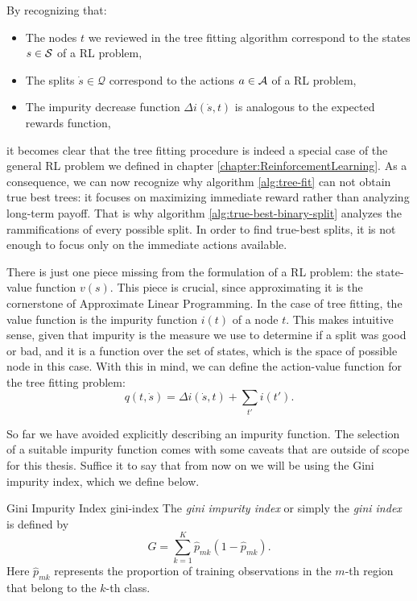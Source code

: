 By recognizing that:
\begin{itemize}
    \item The nodes $t$ we reviewed in the tree fitting algorithm correspond to
        the states $s \in \mathcal{S}$ of a RL problem,
    \item The splits $\dot{s} \in \mathcal{Q}$ correspond to the actions $a \in
        \mathcal{A}$ of a RL problem,
    \item The impurity decrease function $\Delta i(\dot{s}, t)$ is analogous to
        the expected rewards function,
\end{itemize}
it becomes clear that the tree fitting procedure is indeed a special case of the
general RL problem we defined in chapter \ref{chapter:ReinforcementLearning}. As
a consequence, we can now recognize why algorithm \ref{alg:tree-fit} can not
obtain true best trees: it focuses on maximizing immediate reward rather than
analyzing long-term payoff. That is why algorithm
\ref{alg:true-best-binary-split} analyzes the rammifications of every possible
split. In order to find true-best splits, it is not enough to focus only on the
immediate actions available.

There is just one piece missing from the formulation of a RL problem: the state-value function $v(s)$. This piece is crucial, since approximating it is the cornerstone of Approximate Linear Programming. In the case of tree fitting, the value function is the impurity function $i(t)$ of a node $t$. This makes intuitive sense, given that impurity is the measure we use to determine if a split was good or bad, and it is a function over the set of states, which is the space of possible node in this case. With this in mind, we can define the action-value function for the tree fitting problem:
\begin{equation}
    q (t, \dot{s}) = \Delta i(\dot{s}, t) + \sum_{t'} i (t').
\end{equation}

So far we have avoided explicitly describing an impurity function. The selection of a suitable impurity function comes with some caveats that are outside of scope for this thesis. Suffice it to say that from now on we will be using the Gini impurity index, which we define below.

\begin{dfn}{Gini Impurity Index \cite[Ch.~8.1.2]{intro2statslearning} }{gini-index}
    The \emph{gini impurity index} or simply the \emph{gini index} is defined by
    \begin{equation}
        G = \sum_{k=1}^{K} \widehat{p}_{mk}(1 - \widehat{p}_{mk}).
    \end{equation}
    Here $\widehat{p}_{mk}$ represents the proportion of training observations in the $m$-th region that belong to the $k$-th class.
\end{dfn}

